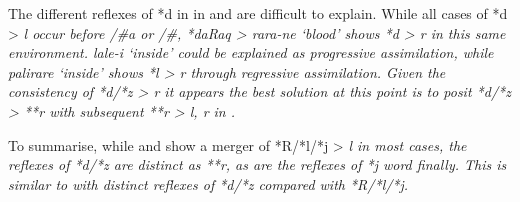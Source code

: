 The different reflexes of *d in  in 
and  are difficult to explain.
While all cases of *d > \it{l} occur before /{\#}{\gap}a or /{\gap}{\#},
*daRaq > \it{rara-ne} ‘blood’ shows *d > \it{r} in this same environment.
 \it{lale-i} ‘inside’ could be explained as progressive
assimilation, while  \it{palirare} ‘inside’ shows *l > \it{r} through regressive assimilation.
Given the consistency of  *d/*z > \it{r} it appears the
best solution at this point is to posit *d/*z > **r with subsequent
**r > \it{l, r} in .

To summarise, while 
and  show a merger of *R/*l/*j > \it{l} in most cases,
the reflexes of *d/*z are distinct as **r,
as are the reflexes of *j word finally.
This is similar to  with distinct reflexes
of *d/*z compared with *R/*l/*j.